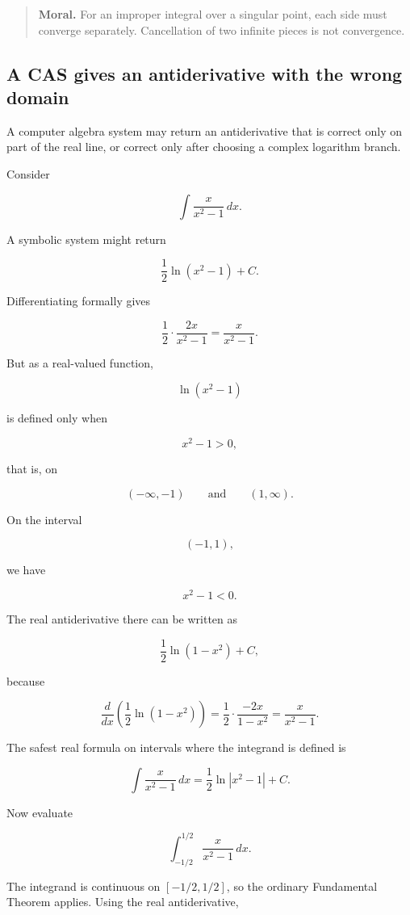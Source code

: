 \begin{quote}
\textbf{Moral.}
For an improper integral over a singular point, each side must converge separately.
Cancellation of two infinite pieces is not convergence.
\end{quote}

\subsection{A CAS gives an antiderivative with the wrong domain}
\label{subsec:cas-wrong-domain-improper}

A computer algebra system may return an antiderivative that is correct only on part of
the real line, or correct only after choosing a complex logarithm branch.

Consider

\[
\int \frac{x}{x^2-1}\,dx.
\]

A symbolic system might return

\[
\frac12\ln(x^2-1)+C.
\]

Differentiating formally gives

\[
\frac12\cdot\frac{2x}{x^2-1}
=
\frac{x}{x^2-1}.
\]

But as a real-valued function,

\[
\ln(x^2-1)
\]

is defined only when

\[
x^2-1>0,
\]

that is, on

\[
(-\infty,-1)
\qquad\text{and}\qquad
(1,\infty).
\]

On the interval

\[
(-1,1),
\]

we have

\[
x^2-1<0.
\]

The real antiderivative there can be written as

\[
\frac12\ln(1-x^2)+C,
\]

because

\[
\frac{d}{dx}\left(\frac12\ln(1-x^2)\right)
=
\frac12\cdot\frac{-2x}{1-x^2}
=
\frac{x}{x^2-1}.
\]

The safest real formula on intervals where the integrand is defined is

\[
\boxed{
\int \frac{x}{x^2-1}\,dx
=
\frac12\ln|x^2-1|+C.
}
\]

Now evaluate

\[
\int_{-1/2}^{1/2}\frac{x}{x^2-1}\,dx.
\]

The integrand is continuous on \([-1/2,1/2]\), so the ordinary Fundamental Theorem
applies.  Using the real antiderivative,

